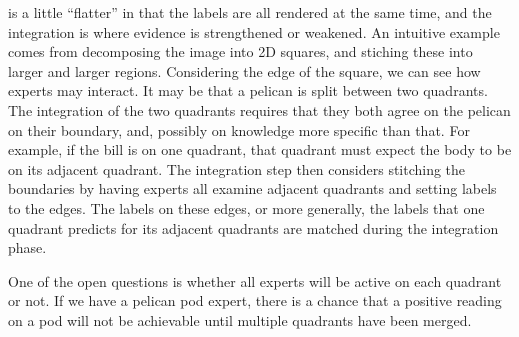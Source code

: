  is a little ``flatter'' in that the labels
are all rendered at the same time, and the integration is where evidence is
strengthened or weakened. An intuitive example comes from decomposing the image
into 2D squares, and stiching these into larger and larger regions. Considering
the edge of the square, we can see how experts may interact. It may be that a
pelican is split between two quadrants. The integration of the two quadrants
requires that they both agree on the pelican on their boundary, and, possibly
on knowledge more specific than that. For example, if the bill is on one
quadrant, that quadrant must expect the body to be on its adjacent quadrant.
The integration step then considers stitching the boundaries by having experts
all examine adjacent quadrants and setting labels to the edges. The labels on
these edges, or more generally, the labels that one quadrant predicts for its
adjacent quadrants are matched during the integration phase.

One of the open questions is whether all experts will be active on each
quadrant or not. If we have a pelican pod expert, there is a chance that a
positive reading on a pod will not be achievable until multiple quadrants have
been merged.


